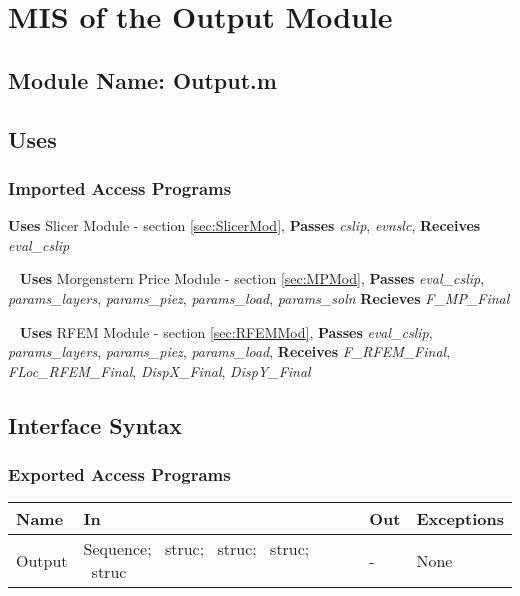 \documentclass[12pt]{article}
\begin{document}
\section{MIS of the Output
  Module} \label{sec:OutputMod}

\subsection{Module Name: Output.m}

\subsection{Uses}

\subsubsection{Imported Access Programs}
\textbf{Uses} Slicer Module - section \ref{sec:SlicerMod},
\textbf{Passes} \textit{cslip}, \textit{evnslc}, \textbf{Receives}
\textit{eval\_cslip}

~\newline\noindent
\textbf{Uses} Morgenstern Price Module - section \ref{sec:MPMod},
\textbf{Passes} \textit{eval\_cslip}, \textit{params\_layers},
\textit{params\_piez}, \textit{params\_load},
\textit{params\_soln} \textbf{Recieves} \textit{F\_MP\_Final}

~\newline\noindent
\textbf{Uses} RFEM Module - section \ref{sec:RFEMMod},
\textbf{Passes} \textit{eval\_cslip}, \textit{params\_layers},
\textit{params\_piez}, \textit{params\_load},
\textbf{Receives} \textit{F\_RFEM\_Final}, \textit{FLoc\_RFEM\_Final},
\textit{DispX\_Final}, \textit{DispY\_Final}

\subsection{Interface Syntax}

\subsubsection{Exported Access Programs}
\renewcommand*{\arraystretch}{1.5}
\begin{tabular}{| p{} | p{} | 
p{} | p{} |} \hline 

  \textbf{Name} & \textbf{In} & \textbf{Out} & \textbf{Exceptions}
  \\ \hline

  Output & Sequence; ~\newline struc; ~\newline struc; ~\newline struc;
  ~\newline struc & - & None \\ \hline

\end{tabular}
\end{document}

